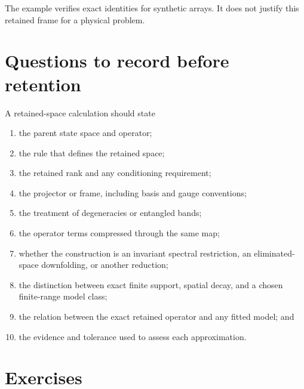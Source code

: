 The example verifies exact identities for synthetic arrays. It does not justify
this retained frame for a physical problem.

\section{Questions to record before retention}

A retained-space calculation should state

\begin{enumerate}
  \item the parent state space and operator;
  \item the rule that defines the retained space;
  \item the retained rank and any conditioning requirement;
  \item the projector or frame, including basis and gauge conventions;
  \item the treatment of degeneracies or entangled bands;
  \item the operator terms compressed through the same map;
  \item whether the construction is an invariant spectral restriction, an
        eliminated-space downfolding, or another reduction;
  \item the distinction between exact finite support, spatial decay, and a
        chosen finite-range model class;
  \item the relation between the exact retained operator and any fitted model;
        and
  \item the evidence and tolerance used to assess each approximation.
\end{enumerate}

\section{Exercises}

